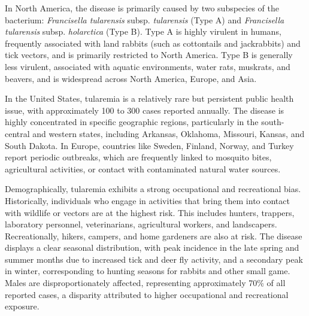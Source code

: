 In North America, the disease is primarily caused by two subspecies of the bacterium: \textit{Francisella tularensis} subsp. \textit{tularensis} (Type A) and \textit{Francisella tularensis} subsp. \textit{holarctica} (Type B). Type A is highly virulent in humans, frequently associated with land rabbits (such as cottontails and jackrabbits) and tick vectors, and is primarily restricted to North America. Type B is generally less virulent, associated with aquatic environments, water rats, muskrats, and beavers, and is widespread across North America, Europe, and Asia.

In the United States, tularemia is a relatively rare but persistent public health issue, with approximately 100 to 300 cases reported annually. The disease is highly concentrated in specific geographic regions, particularly in the south-central and western states, including Arkansas, Oklahoma, Missouri, Kansas, and South Dakota. In Europe, countries like Sweden, Finland, Norway, and Turkey report periodic outbreaks, which are frequently linked to mosquito bites, agricultural activities, or contact with contaminated natural water sources.

Demographically, tularemia exhibits a strong occupational and recreational bias. Historically, individuals who engage in activities that bring them into contact with wildlife or vectors are at the highest risk. This includes hunters, trappers, laboratory personnel, veterinarians, agricultural workers, and landscapers. Recreationally, hikers, campers, and home gardeners are also at risk. The disease displays a clear seasonal distribution, with peak incidence in the late spring and summer months due to increased tick and deer fly activity, and a secondary peak in winter, corresponding to hunting seasons for rabbits and other small game. Males are disproportionately affected, representing approximately 70\% of all reported cases, a disparity attributed to higher occupational and recreational exposure.

